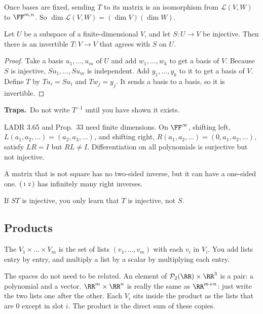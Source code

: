 \documentclass[11pt]{scrartcl}
\newcommand{\LL}{\mathcal L}
\newcommand{\PP}{\mathcal P}
\newcommand{\traps}{\par\medskip\noindent\textbf{\color{RawSienna}Traps.}\ }
\begin{document}
\begin{proposition*}[Prop.~26]
  Once bases are fixed, sending $T$ to its matrix is an isomorphism from $\LL(V,W)$ to $\FF^{m,n}$.
  So $\dim\LL(V,W)=(\dim V)(\dim W)$.
\end{proposition*}

\begin{proposition*}[HW4 P7]
  Let $U$ be a subspace of a finite-dimensional $V$, and let $S\colon U\to V$ be injective.
  Then there is an invertible $T\colon V\to V$ that agrees with $S$ on $U$.
\end{proposition*}
\begin{proof}
  Take a basis $u_1,\dots,u_m$ of $U$ and add $w_1,\dots,w_k$ to get a basis of $V$.
  Because $S$ is injective, $Su_1,\dots,Su_m$ is independent. Add $y_1,\dots,y_k$ to it to get a basis of $V$.
  Define $T$ by $Tu_i=Su_i$ and $Tw_j=y_j$. It sends a basis to a basis, so it is invertible.
\end{proof}

\traps Do not write $T^{-1}$ until you have shown it exists.

LADR 3.65 and Prop.~33 need finite dimensions. On $\FF^\infty$, shifting left, $L(a_1,a_2,\dots)=(a_2,a_3,\dots)$, and shifting right, $R(a_1,a_2,\dots)=(0,a_1,a_2,\dots)$, satisfy $LR=I$ but $RL\ne I$. Differentiation on all polynomials is surjective but not injective.

A matrix that is not square has no two-sided inverse, but it can have a one-sided one. $\begin{psmallmatrix}1&2\end{psmallmatrix}$ has infinitely many right inverses.

If $ST$ is injective, you only learn that $T$ is injective, not $S$.

\subsection{Products}
\begin{definition*}
  The  $V_1\times\dots\times V_m$ is the set of lists $(v_1,\dots,v_m)$ with each $v_i$ in $V_i$.
  You add lists entry by entry, and multiply a list by a scalar by multiplying each entry.
\end{definition*}
The spaces do not need to be related. An element of $\PP_2(\RR)\times\RR^3$ is a pair: a polynomial and a vector.
$\RR^m\times\RR^n$ is really the same as $\RR^{m+n}$: just write the two lists one after the other.
Each $V_i$ sits inside the product as the lists that are $0$ except in slot $i$. The product is the direct sum of these copies.
\end{document}
